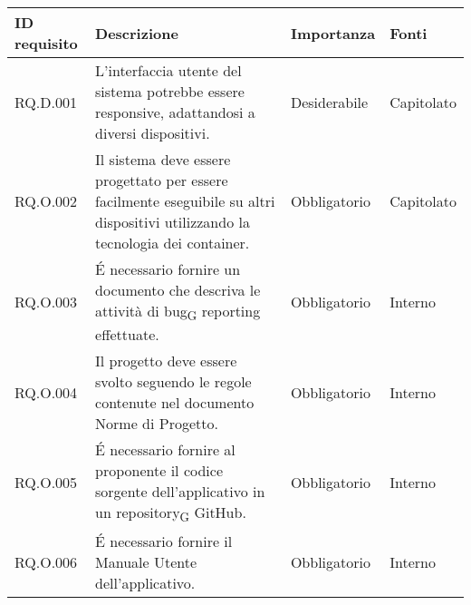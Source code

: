 \begin{longtable}{|C{2.7cm}|L{7.2cm}|C{2.7cm}|C{2cm}|}
        \hline
        \textbf{ID requisito} & \textbf{Descrizione} & \textbf{Importanza} & \textbf{Fonti}  \\
        \hline
       
        \hline
        RQ.D.001 & L'interfaccia utente del sistema potrebbe essere responsive, adattandosi a diversi dispositivi. & Desiderabile & Capitolato \\
        \hline
        RQ.O.002 & Il sistema deve essere progettato per essere facilmente eseguibile su altri dispositivi utilizzando la tecnologia dei container. & Obbligatorio & Capitolato \\
        
        \hline
        RQ.O.003 & \'E necessario fornire un documento che descriva le attività di bug\textsubscript{G} reporting effettuate. & Obbligatorio & Interno \\
        \hline
        RQ.O.004 & Il progetto deve essere svolto seguendo le regole contenute nel documento Norme di Progetto. & Obbligatorio & Interno \\
        \hline
        RQ.O.005 & \'E necessario fornire al proponente il codice sorgente dell'applicativo in un
        repository\textsubscript{G} GitHub. & Obbligatorio & Interno \\
        \hline
        RQ.O.006 & \'E necessario fornire il Manuale Utente dell'applicativo. & Obbligatorio & Interno \\
        \hline
        
        


\end{longtable}